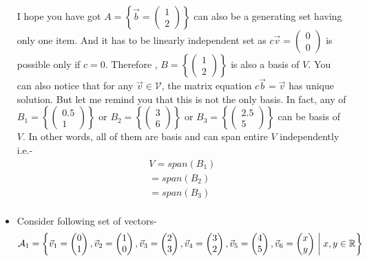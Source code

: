 \documentclass{article}
\newcommand{\suchthat}{\;\ifnum\currentgrouptype=16 \middle\fi|\;}%
\begin{document}
\begin{itemize}
I hope you have got \(A= \left\{\vec{b}=
\begin{pmatrix}
1\\2
\end{pmatrix}
\right\}\) can also be a generating set having only one item. And it has to be linearly independent set as \(c\vec{v}= \begin{pmatrix} 0 \\ 0\end{pmatrix} \) is possible only if $c=0$. Therefore , \(B=\left\{\begin{pmatrix} 1 \\ 2 \end{pmatrix} \right\}\) is also a basis of $V$. You can also notice that for any $\vec{v} \in \mathcal{V}$, the matrix equation $c \vec{b} = \vec{v}$ has unique solution. But let me remind you that this is not the only basis. In fact, any of 
\(B_1 = \left \{ \begin{pmatrix} 0.5\\1 \end{pmatrix} \right\}\) 
or \( B_2 = \left\{\begin{pmatrix}3\\6\end{pmatrix}\right\}\)
or \(B_3 = \left\{\begin{pmatrix}2.5\\5\end{pmatrix}\right\}\) can be basis of $V$.
In other words, all of them are basis and can span entire $V$ independently i.e.-
\begin{align*}
    V=span({B_1})\\
     =span({B_2})\\
     =span({B_3})\\
\end{align*}
\item Consider following set of vectors-
\[\mathcal{A}_1=
 \left\{\vec{v}_1=
\begin{pmatrix}
0\\1
\end{pmatrix}
,\vec{v}_2=
\begin{pmatrix}
1\\0
\end{pmatrix}
,\vec{v}_3=\begin{pmatrix}
2\\3
\end{pmatrix}
,\vec{v}_4=\begin{pmatrix}
3\\2
\end{pmatrix}
,\vec{v}_5=\begin{pmatrix}
4\\5
\end{pmatrix}
,\vec{v}_6=\begin{pmatrix}
x\\y
\end{pmatrix}
\suchthat  x,y \in \mathbb{R}
\right\}\]


\end{itemize}
\end{document}
